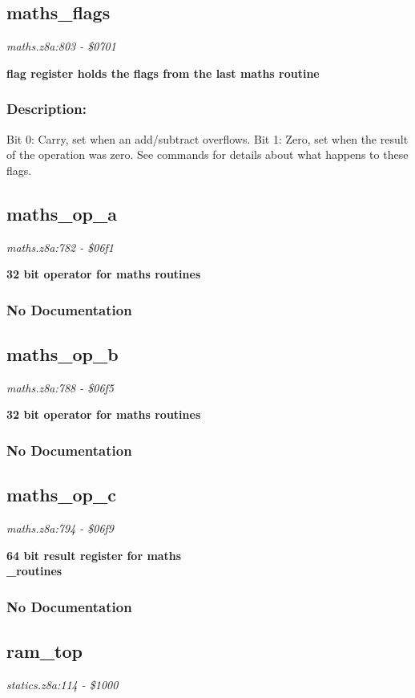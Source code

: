 \subsection{maths\_flags}
\textit{maths.z8a:803 - \$0701}

\noindent
\textbf{flag register holds the flags from the last maths routine}

\subsubsection{Description:}
 Bit 0: Carry, set when an add/subtract overflows. Bit 1: Zero, set when the result of the operation was zero. See commands for details about what happens to these flags.

\subsection{maths\_op\_a}
\textit{maths.z8a:782 - \$06f1}

\noindent
\textbf{32 bit operator for maths routines}

\subsubsection{No Documentation}


\subsection{maths\_op\_b}
\textit{maths.z8a:788 - \$06f5}

\noindent
\textbf{32 bit operator for maths routines}

\subsubsection{No Documentation}


\subsection{maths\_op\_c}
\textit{maths.z8a:794 - \$06f9}

\noindent
\textbf{64 bit result register for maths\\\_routines}

\subsubsection{No Documentation}


\subsection{ram\_top}
\textit{statics.z8a:114 - \$1000}

